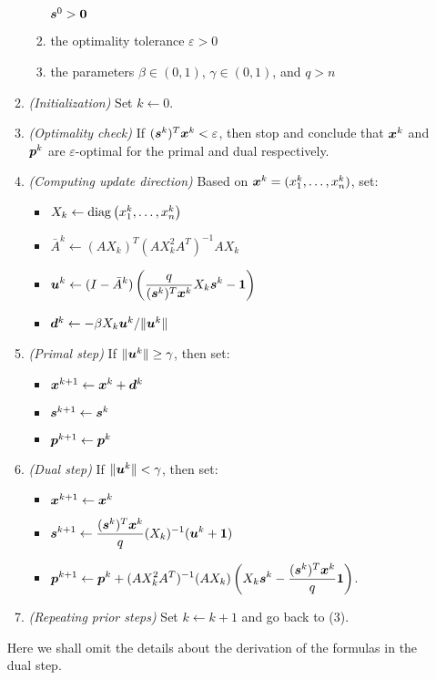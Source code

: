 \begin{enumerate}
\begin{enumerate}[label={(\arabic*)}]
\begin{enumerate}
\(\bm{s}^{0}>\bm{0}\)
\item the optimality tolerance \(\varepsilon>0\)
\item the parameters \(\beta\in (0,1)\), \(\gamma\in (0,1)\), and \(q>n\)
\end{enumerate}
\item \emph{(Initialization)} Set \(k\leftarrow 0\).
\item \emph{(Optimality check)} If
\((\bm{s}^{k})^{T}\bm{x}^{k}<\varepsilon\), then stop and conclude that
\(\bm{x}^{k}\) and \(\bm{p}^{k}\) are \(\varepsilon\)-optimal for the
primal and dual respectively.
\item \emph{(Computing update direction)} Based on
\(\bm{x}^{k}=(x_1^{k},\dotsc,x_n^{k})\), set:
\begin{itemize}
\item \(X_k\leftarrow\operatorname{diag}\left(x_1^{k},\dotsc,x_n^{k}\right)\)
\item \(\bar{A}^{k}\leftarrow (AX_k)^{T}(AX_k^{2}A^{T})^{-1}AX_k\)
\item \(\displaystyle \bm{u}^{k}\leftarrow (I-\bar{A}^{k})\left(\frac{q}
{(\bm{s}^{k})^{T}\bm{x}^{k}}X_k\bm{s}^{k}-\bm{1}\right)\)
\item \(\bm{d}^{k}\leftarrow -\beta X_k\bm{u}^{k}/\|\bm{u}^{k}\|\)
\end{itemize}
\item \emph{(Primal step)} If \(\|\bm{u}^{k}\|\ge\gamma\), then set:
\begin{itemize}
\item \(\bm{x}^{k+1}\leftarrow \bm{x}^{k}+\bm{d}^{k}\)
\item \(\bm{s}^{k+1}\leftarrow \bm{s}^{k}\)
\item \(\bm{p}^{k+1}\leftarrow \bm{p}^{k}\)
\end{itemize}
\item \emph{(Dual step)} If \(\|\bm{u}^{k}\|<\gamma\), then set:
\begin{itemize}
\item \(\bm{x}^{k+1}\leftarrow \bm{x}^{k}\)
\item \(\displaystyle \bm{s}^{k+1}\leftarrow
\frac{(\bm{s}^{k})^{T}\bm{x}^{k}}{q}(X_k)^{-1}(\bm{u}^{k}+\bm{1})\)
\item \(\displaystyle \bm{p}^{k+1}\leftarrow \bm{p}^{k}
+(AX_k^{2}A^{T})^{-1}(AX_{k})
\left(X_k\bm{s}^{k}-\frac{(\bm{s}^{k})^{T}\bm{x}^{k}}{q}\bm{1}\right)\).
\end{itemize}
\item \emph{(Repeating prior steps)} Set \(k\leftarrow k+1\) and go back to (3).
\end{enumerate}
\begin{note}
Here we shall omit the details about the derivation of the formulas in the dual
step.
\end{note}
\end{enumerate}
